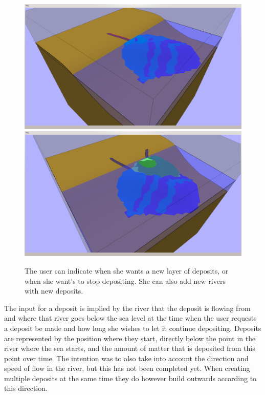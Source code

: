 \documentclass[a4paper,12pt]{report}
\begin{document}
\begin{figure}
\includegraphics[trim = 120mm 7mm 30mm 30mm, clip,width=.5\linewidth]{thesis/results/depositLayered.png}
\includegraphics[trim = 120mm 7mm 30mm 30mm, clip,width=.5\linewidth]{thesis/results/depositNew.png}
 \caption{The user can indicate when she wants a new layer of deposits, or when she want's to stop depositing. She can also add new rivers with new deposits.}
 \label{fig:depositLayer}
\end{figure}

 The input for a deposit is implied by the river that the deposit is flowing from and where that river goes below the sea level at the time when the user requests a deposit be made and how long she wishes to let it continue depositing. Deposits are represented by the position where they start, directly below the point in the river where the sea starts, and the amount of matter that is deposited from this point over time. The intention was to also take into account the direction and speed of flow in the river, but this has not been completed yet. When creating multiple deposits at the same time they do however build outwards according to this direction.
\end{document}
